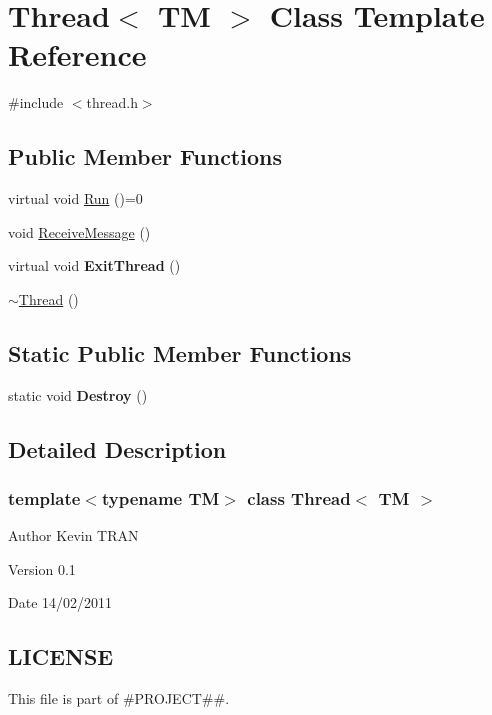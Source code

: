 \hypertarget{classThread_3_01TM_01_4}{
\section{Thread$<$ TM $>$ Class Template Reference}
\label{d6/d40/classThread_3_01TM_01_4}
}


{\ttfamily \#include $<$thread.h$>$}

\subsection*{Public Member Functions}
\begin{DoxyCompactItemize}
\item 
virtual void \hyperlink{classThread_3_01TM_01_4_a07205f10bf394dcd1d31f3501236c77a}{Run} ()=0
\item 
void \hyperlink{classThread_3_01TM_01_4_a436671ed271ff2cc47e228b9f2d62043}{ReceiveMessage} ()
\item 
\hypertarget{classThread_3_01TM_01_4_ae1393664916881d35f65d3a7585d48dd}{
virtual void {\bfseries ExitThread} ()}
\label{d6/d40/classThread_3_01TM_01_4_ae1393664916881d35f65d3a7585d48dd}

\item 
\hyperlink{classThread_3_01TM_01_4_a7be785d060b3f0eac64a96befb552db5}{$\sim$Thread} ()
\end{DoxyCompactItemize}
\subsection*{Static Public Member Functions}
\begin{DoxyCompactItemize}
\item 
\hypertarget{classThread_3_01TM_01_4_a6117d11dbe4180e8c19ed7a1b66d5b41}{
static void {\bfseries Destroy} ()}
\label{d6/d40/classThread_3_01TM_01_4_a6117d11dbe4180e8c19ed7a1b66d5b41}

\end{DoxyCompactItemize}


\subsection{Detailed Description}
\subsubsection*{template$<$typename TM$>$ class Thread$<$ TM $>$}

\begin{DoxyAuthor}{Author}
Kevin TRAN 
\end{DoxyAuthor}
\begin{DoxyVersion}{Version}
0.1 
\end{DoxyVersion}
\begin{DoxyDate}{Date}
14/02/2011 
\end{DoxyDate}
\hypertarget{d6/d40/classThread_3_01TM_01_4_LICENSE}{}\subsection{LICENSE}\label{d6/d40/classThread_3_01TM_01_4_LICENSE}
This file is part of \#PROJECT\#\#.

